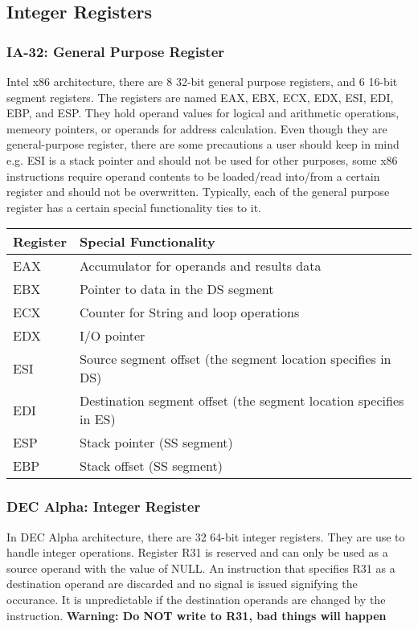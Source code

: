 \documentclass[letterpaper,10pt,titlepage]{article}
\begin{document}
\subsection{Integer Registers}

\subsubsection{IA-32: General Purpose Register}
Intel x86 architecture, there are 8 32-bit general purpose registers, and 
6 16-bit segment registers. The registers are named EAX, EBX, ECX, EDX, ESI, 
EDI, EBP, and ESP. They hold operand values for logical and arithmetic 
operations, memeory pointers, or operands for address calculation. Even though
they are general-purpose register, there are some precautions a user should 
keep in mind e.g. ESI is a stack pointer and should not be used for other 
purposes, some x86 instructions require operand contents to be loaded/read
into/from a certain register and should not be overwritten. Typically, each
of the general purpose register has a certain special functionality ties to it.


\begin{center}
   \begin{longtable}{l p{10cm}}
      \textbf{Register} & \textbf{Special Functionality} \\ \hline
      EAX & Accumulator for operands and results data\\
      EBX & Pointer to data in the DS segment\\
      ECX & Counter for String and loop operations\\
      EDX & I/O pointer\\
      ESI & Source segment offset (the segment location specifies in DS) \\
      EDI & Destination segment offset (the segment location specifies in ES)\\
      ESP & Stack pointer (SS segment)\\
      EBP & Stack offset (SS segment)\\
      \hline
   \end{longtable}
\end{center}


\subsubsection{DEC Alpha: Integer Register}
In DEC Alpha architecture, there are 32 64-bit integer registers. They are use
to handle integer operations. Register R31 is reserved and can only be used as 
a source operand with the value of NULL. An instruction that specifies R31 as 
a destination operand are discarded and no signal is issued signifying the 
occurance. It is unpredictable if the destination operands are changed by
the instruction. \textbf{Warning: Do NOT write to R31, bad things will happen}
\end{document}
